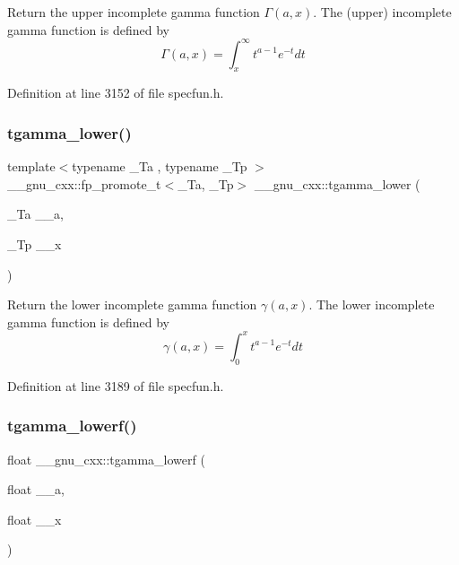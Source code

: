 Return the upper incomplete gamma function $ \Gamma(a,x) $. The (upper) incomplete gamma function is defined by \[ \Gamma(a,x) = \int_x^\infty t^{a-1}e^{-t}dt \] 

Definition at line 3152 of file specfun.\+h.

\mbox{\label{group__mathsf__gnu_gaed107908dec8865ea48e7764f7ea88a2}} 
\subsubsection{\texorpdfstring{tgamma\+\_\+lower()}{tgamma\_lower()}}
{\footnotesize\ttfamily template$<$typename \+\_\+\+Ta , typename \+\_\+\+Tp $>$ \\
\+\_\+\+\_\+gnu\+\_\+cxx\+::fp\+\_\+promote\+\_\+t$<$\+\_\+\+Ta, \+\_\+\+Tp$>$ \+\_\+\+\_\+gnu\+\_\+cxx\+::tgamma\+\_\+lower (\begin{DoxyParamCaption}\item[{\+\_\+\+Ta}]{\+\_\+\+\_\+a,  }\item[{\+\_\+\+Tp}]{\+\_\+\+\_\+x }\end{DoxyParamCaption})\hspace{0.3cm}{\ttfamily [inline]}}

Return the lower incomplete gamma function $ \gamma(a,x) $. The lower incomplete gamma function is defined by \[ \gamma(a,x) = \int_0^x t^{a-1}e^{-t}dt \] 

Definition at line 3189 of file specfun.\+h.

\mbox{\label{group__mathsf__gnu_ga8f2aabeaa29d21b19c43972efb26798c}} 
\subsubsection{\texorpdfstring{tgamma\+\_\+lowerf()}{tgamma\_lowerf()}}
{\footnotesize\ttfamily float \+\_\+\+\_\+gnu\+\_\+cxx\+::tgamma\+\_\+lowerf (\begin{DoxyParamCaption}\item[{float}]{\+\_\+\+\_\+a,  }\item[{float}]{\+\_\+\+\_\+x }\end{DoxyParamCaption})\hspace{0.3cm}{\ttfamily [inline]}}

